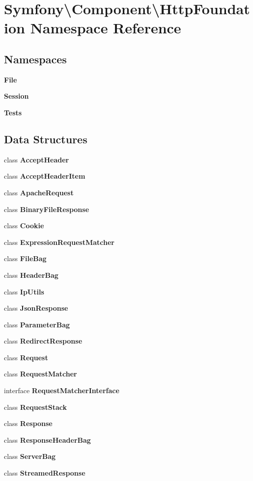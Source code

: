 \section{Symfony\textbackslash{}Component\textbackslash{}Http\+Foundation Namespace Reference}
\label{namespace_symfony_1_1_component_1_1_http_foundation}
\subsection*{Namespaces}
\begin{DoxyCompactItemize}
\item 
 {\bf File}
\item 
 {\bf Session}
\item 
 {\bf Tests}
\end{DoxyCompactItemize}
\subsection*{Data Structures}
\begin{DoxyCompactItemize}
\item 
class {\bf Accept\+Header}
\item 
class {\bf Accept\+Header\+Item}
\item 
class {\bf Apache\+Request}
\item 
class {\bf Binary\+File\+Response}
\item 
class {\bf Cookie}
\item 
class {\bf Expression\+Request\+Matcher}
\item 
class {\bf File\+Bag}
\item 
class {\bf Header\+Bag}
\item 
class {\bf Ip\+Utils}
\item 
class {\bf Json\+Response}
\item 
class {\bf Parameter\+Bag}
\item 
class {\bf Redirect\+Response}
\item 
class {\bf Request}
\item 
class {\bf Request\+Matcher}
\item 
interface {\bf Request\+Matcher\+Interface}
\item 
class {\bf Request\+Stack}
\item 
class {\bf Response}
\item 
class {\bf Response\+Header\+Bag}
\item 
class {\bf Server\+Bag}
\item 
class {\bf Streamed\+Response}
\end{DoxyCompactItemize}
